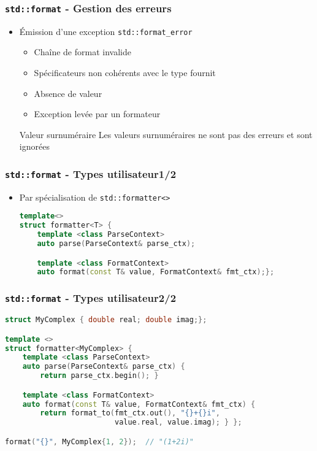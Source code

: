 \documentclass[C++.tex]{subfiles}
\begin{document}
\begin{frame}[fragile]
	\frametitle{\lstinline|std::format| - Gestion des erreurs}
	\begin{itemize}
		\item Émission d'une exception \lstinline|std::format_error|
		\begin{itemize}
			\item Chaîne de format invalide
			\item Spécificateurs non cohérents avec le type fournit
			\item Absence de valeur
			\item Exception levée par un formateur
		\end{itemize}

		\begin{block}{Valeur surnuméraire}
			Les valeurs surnuméraires ne sont pas des erreurs et sont ignorées
		\end{block}
	\end{itemize}
\end{frame}

\begin{frame}[fragile]
	\frametitle{\lstinline|std::format| - Types utilisateur\titlehfill{}1/2}
	\begin{itemize}
		\item Par spécialisation de \lstinline|std::formatter<>|
		
		\begin{lstlisting}[language=C++]
template<>
struct formatter<T> {
	template <class ParseContext>
	auto parse(ParseContext& parse_ctx);

	template <class FormatContext>
	auto format(const T& value, FormatContext& fmt_ctx);};\end{lstlisting}
	\end{itemize}
\end{frame}

\begin{frame}[fragile]
	\frametitle{\lstinline|std::format| - Types utilisateur\titlehfill{}2/2}
	\begin{lstlisting}[language=C++]
struct MyComplex { double real; double imag;};

template <>
struct formatter<MyComplex> {
	template <class ParseContext>
	auto parse(ParseContext& parse_ctx) { 
		return parse_ctx.begin(); }

	template <class FormatContext>
	auto format(const T& value, FormatContext& fmt_ctx) {
		return format_to(fmt_ctx.out(), "{}+{}i", 
		                 value.real, value.imag); } };

format("{}", MyComplex{1, 2});	// "(1+2i)"\end{lstlisting}
\end{frame}
\end{document}
